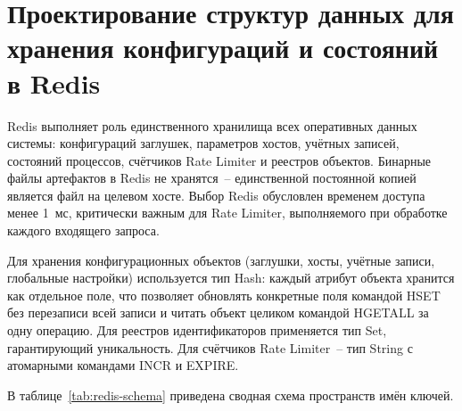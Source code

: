 \section{Проектирование структур данных для хранения конфигураций и состояний в Redis}


Redis выполняет роль единственного хранилища всех оперативных данных системы: конфигураций заглушек, параметров хостов, учётных записей, состояний процессов, счётчиков Rate Limiter и реестров объектов. Бинарные файлы артефактов в Redis не хранятся~-- единственной постоянной копией является файл на целевом хосте. Выбор Redis обусловлен временем доступа менее 1~мс, критически важным для Rate Limiter, выполняемого при обработке каждого входящего запроса.

Для хранения конфигурационных объектов (заглушки, хосты, учётные записи, глобальные настройки) используется тип Hash: каждый атрибут объекта хранится как отдельное поле, что позволяет обновлять конкретные поля командой HSET без перезаписи всей записи и читать объект целиком командой HGETALL за одну операцию. Для реестров идентификаторов применяется тип Set, гарантирующий уникальность. Для счётчиков Rate Limiter~-- тип String с атомарными командами INCR и EXPIRE.


В таблице~\ref{tab:redis-schema} приведена сводная схема пространств имён ключей.

